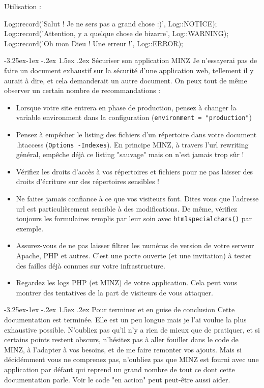 \documentclass[a4paper,11pt]{article}
\makeatletter
\renewcommand{\subsection}{\@startsection{subsection}{2}{\z@}%
             {-3.25ex\@plus -1ex \@minus -.2ex}%
             {1.5ex \@plus .2ex}%
             {\color{bleuFonce}\normalfont\large\bfseries}}
\makeatother
\begin{document}
Utilisation :
\begin{PHP}
Log::record('Salut ! Je ne sers pas a grand chose :)', Log::NOTICE);
Log::record('Attention, y a quelque chose de bizarre', Log::WARNING);
Log::record('Oh mon Dieu ! Une erreur !', Log::ERROR);
\end{PHP}

\subsection{Sécuriser son application MINZ}
Je n'essayerai pas de faire un document exhaustif sur la sécurité d'une application web, tellement il y aurait à dire, et cela demanderait un autre document. On peux tout de même observer un certain nombre de recommandations :
\begin{itemize}
  \item Lorsque votre site entrera en phase de production, pensez à changer la variable environment dans la configuration (\texttt{environment = "production"})
  \item Pensez à empêcher le listing des fichiers d'un répertoire dans votre document .htaccess (\texttt{Options -Indexes}). En principe MINZ, à travers l'url rewriting général, empêche déjà ce listing "sauvage" mais on n'est jamais trop sûr !
  \item Vérifiez les droits d'accès à vos répertoires et fichiers pour ne pas laisser des droits d'écriture sur des répertoires sensibles !
  \item Ne faites jamais confiance à ce que vos visiteurs font. Dites vous que l'adresse url est particulièrement sensible à des modifications. De même, vérifiez toujours les formulaires remplis par leur soin avec \texttt{htmlspecialchars()} par exemple.
  \item Assurez-vous de ne pas laisser filtrer les numéros de version de votre serveur Apache, PHP et autres. C'est une porte ouverte (et une invitation) à tester des failles déjà connues sur votre infrastructure.
  \item Regardez les logs PHP (et MINZ) de votre application. Cela peut vous montrer des tentatives de la part de visiteurs de vous attaquer.
\end{itemize}

\subsection{Pour terminer et en guise de conclusion}
Cette documentation est terminée. Elle est un peu longue mais je l'ai voulue la plus exhaustive possible. N'oubliez pas qu'il n'y a rien de mieux que de pratiquer, et si certains points restent obscurs, n'hésitez pas à aller fouiller dans le code de MINZ, à l'adapter à vos besoins, et de me faire remonter vos ajouts. Mais si décidémment vous ne comprenez pas, n'oubliez pas que MINZ est fourni avec une application par défaut qui reprend un grand nombre de tout ce dont cette documentation parle. Voir le code "en action" peut peut-être aussi aider.
\end{document}

